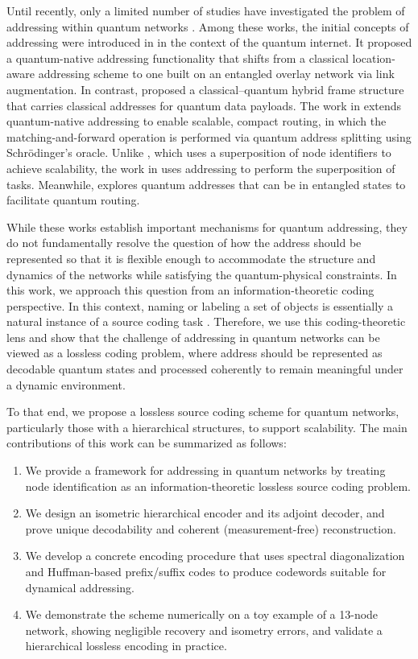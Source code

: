 \documentclass[conference]{IEEEtran}
\begin{document}
Until recently, only a limited number of studies have investigated the problem of addressing within quantum networks \cite{10299662, PhysRevResearch.4.043064, 11322738, MiguelRamiro2021SuperposedTasks,Pirker2026QuantumAddressing}. Among these works, the initial concepts of addressing were introduced in \cite{10299662} in the context of the quantum internet. It proposed a quantum-native addressing functionality that shifts from a classical location-aware addressing scheme to one built on an entangled overlay network via link augmentation. In contrast, \cite{PhysRevResearch.4.043064} proposed a classical–quantum hybrid frame structure that carries classical addresses for quantum data payloads. The work in \cite{11322738} extends quantum-native addressing to enable scalable, compact routing, in which the matching-and-forward operation is performed via quantum address splitting using Schrödinger’s oracle. Unlike \cite{11322738}, which uses a superposition of node identifiers to achieve scalability, the work in \cite{MiguelRamiro2021SuperposedTasks} uses addressing to perform the superposition of tasks. Meanwhile, \cite{Pirker2026QuantumAddressing} explores quantum addresses that can be in entangled states to facilitate quantum routing.  

While these works establish important mechanisms for quantum addressing, they do not fundamentally resolve the question of how the address should be represented so that it is flexible enough to accommodate the structure and dynamics of the networks while satisfying the quantum-physical constraints. In this work, we approach this question from an information-theoretic coding perspective. In this context, naming or labeling a set of objects is essentially a natural instance of a source coding task \cite{PhysRevA.65.032313}. Therefore, we use this coding-theoretic lens and show that the challenge of addressing in quantum networks can be viewed as a lossless coding problem, where address should be represented as decodable quantum states and processed coherently to remain meaningful under a dynamic environment.

To that end, we propose a lossless source coding scheme for quantum networks, particularly those with a hierarchical structures, to support scalability. The main contributions of this work can be summarized as follows:
\begin{enumerate}
    \item We provide a framework for addressing in quantum networks by treating node identification as an information-theoretic lossless source coding problem.
    \item We design an isometric hierarchical encoder and its adjoint decoder, and prove unique decodability and coherent (measurement-free) reconstruction.
    \item We develop a concrete encoding procedure that uses spectral diagonalization and Huffman-based prefix/suffix codes to produce codewords suitable for dynamical addressing.
    \item We demonstrate the scheme numerically on a toy example of a 13-node network, showing negligible recovery and isometry errors, and validate a hierarchical lossless encoding in practice.
\end{enumerate}
\end{document}
